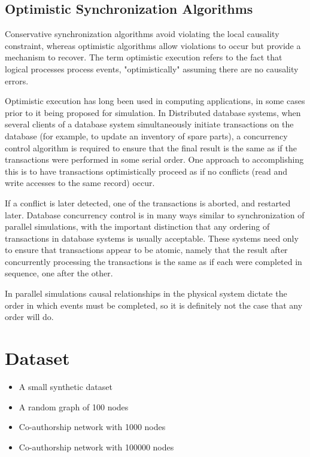 \documentclass[12pt,a4paper]{article}
\begin{document}
	\subsection{Optimistic Synchronization Algorithms}
	
Conservative synchronization algorithms avoid violating the local causality constraint, whereas optimistic algorithms allow violations to occur but provide a mechanism to recover. The term optimistic execution refers to the fact that logical processes process events, "optimistically" assuming there are no causality errors.

Optimistic execution has long been used in computing applications, in some cases prior to it being proposed for simulation. In Distributed database systems, when several clients of a database system simultaneously initiate transactions on the database (for example, to update an inventory of spare parts), a concurrency control algorithm is required to ensure that the final result is the same as if the transactions were performed in some serial order. One approach to accomplishing this is to have transactions optimistically proceed as if no conflicts (read and write accesses to the same record) occur.

If a conflict is later detected, one of the transactions is aborted, and restarted later. Database concurrency control is in many ways similar to synchronization of parallel simulations, with the important distinction that any ordering of transactions in database systems is usually acceptable. These systems need only to ensure that transactions appear to be atomic, namely that the result after concurrently processing the transactions is the same as if each were completed in sequence, one after the other.

In parallel simulations causal relationships in the physical system dictate the order in which events must be completed, so it is definitely not the case that any order will do.

\section{Dataset}
	\begin{itemize}[nolistsep]
		\item A small synthetic dataset
		\item A random graph of 100 nodes
		\item Co-authorship network with 1000 nodes
		\item Co-authorship network with 100000 nodes
	\end{itemize}
\end{document}
